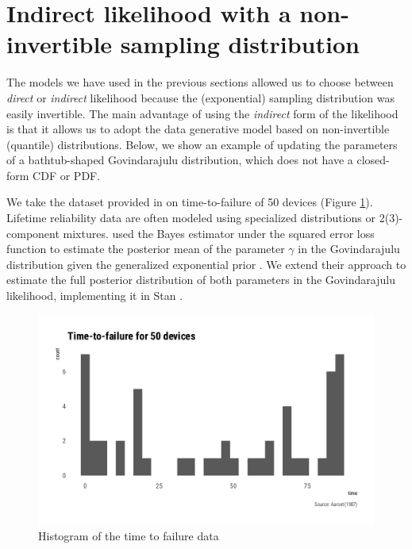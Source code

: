 \documentclass[
  12pt,
]{article}
\begin{document}
\hypertarget{indirect-likelihood-with-a-non-invertible-sampling-distribution}{%
\section{Indirect likelihood with a non-invertible sampling distribution}\label{indirect-likelihood-with-a-non-invertible-sampling-distribution}}

The models we have used in the previous sections allowed us to choose between \emph{direct} or \emph{indirect} likelihood because the (exponential) sampling distribution was easily invertible. The main advantage of using the \emph{indirect} form of the likelihood is that it allows us to adopt the data generative model based on non-invertible (quantile) distributions. Below, we show an example of updating the parameters of a bathtub-shaped Govindarajulu distribution, which does not have a closed-form CDF or PDF.

We take the dataset provided in \citet{aarset1987HowIdentifyBathtub} on time-to-failure of 50 devices (Figure \ref{fig:bathtub-hist}). Lifetime reliability data are often modeled using specialized distributions \citep{nadarajah2009BathtubshapedFailureRate} or 2(3)-component mixtures. \citet{nair2020BayesianInferenceQuantile} used the Bayes estimator under the squared error loss function to estimate the posterior mean of the parameter \(\gamma\) in the Govindarajulu distribution \citep{nair2012GovindarajuluDistributionProperties} given the generalized exponential prior \citep{gupta2007GeneralizedExponentialDistribution}. We extend their approach to estimate the full posterior distribution of both parameters in the Govindarajulu likelihood, implementing it in Stan \citep{standevelopmentteam2021RStanInterfaceStan}.

\begin{figure}

{\centering \includegraphics[width=0.8\linewidth]{ilbm_article_files/figure-latex/bathtub-hist-1} 

}

\caption{Histogram of the time to failure data}\label{fig:bathtub-hist}
\end{figure}
\end{document}
